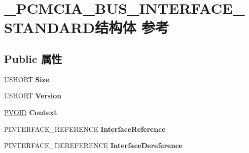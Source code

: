 \hypertarget{struct___p_c_m_c_i_a___b_u_s___i_n_t_e_r_f_a_c_e___s_t_a_n_d_a_r_d}{}\section{\+\_\+\+P\+C\+M\+C\+I\+A\+\_\+\+B\+U\+S\+\_\+\+I\+N\+T\+E\+R\+F\+A\+C\+E\+\_\+\+S\+T\+A\+N\+D\+A\+R\+D结构体 参考}
\label{struct___p_c_m_c_i_a___b_u_s___i_n_t_e_r_f_a_c_e___s_t_a_n_d_a_r_d}
\subsection*{Public 属性}
\begin{DoxyCompactItemize}
\item 
\mbox{\label{struct___p_c_m_c_i_a___b_u_s___i_n_t_e_r_f_a_c_e___s_t_a_n_d_a_r_d_a68e715c1a17a7c265fb7c6568ff1435a}} 
U\+S\+H\+O\+RT {\bfseries Size}
\item 
\mbox{\label{struct___p_c_m_c_i_a___b_u_s___i_n_t_e_r_f_a_c_e___s_t_a_n_d_a_r_d_aff4542325dc6906ea84353dd9921e1b8}} 
U\+S\+H\+O\+RT {\bfseries Version}
\item 
\mbox{\label{struct___p_c_m_c_i_a___b_u_s___i_n_t_e_r_f_a_c_e___s_t_a_n_d_a_r_d_a9d42bd8ab95609d1e2cc170f00ac9aa6}} 
\hyperlink{interfacevoid}{P\+V\+O\+ID} {\bfseries Context}
\item 
\mbox{\label{struct___p_c_m_c_i_a___b_u_s___i_n_t_e_r_f_a_c_e___s_t_a_n_d_a_r_d_abcba4211bf86c0529f03e25bf6d68144}} 
P\+I\+N\+T\+E\+R\+F\+A\+C\+E\+\_\+\+R\+E\+F\+E\+R\+E\+N\+CE {\bfseries Interface\+Reference}
\item 
\mbox{\label{struct___p_c_m_c_i_a___b_u_s___i_n_t_e_r_f_a_c_e___s_t_a_n_d_a_r_d_a430cb6d6a5cb8440170423a5587ff70f}} 
P\+I\+N\+T\+E\+R\+F\+A\+C\+E\+\_\+\+D\+E\+R\+E\+F\+E\+R\+E\+N\+CE {\bfseries Interface\+Dereference}

\end{DoxyCompactItemize}
